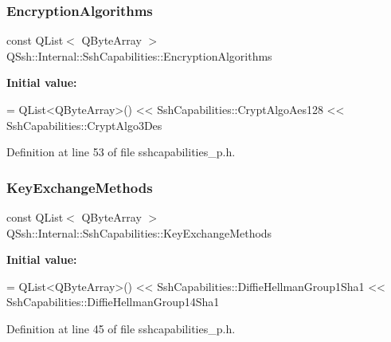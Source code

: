 \subsubsection{\texorpdfstring{Encryption\+Algorithms}{EncryptionAlgorithms}}
{\footnotesize\ttfamily const Q\+List$<$ Q\+Byte\+Array $>$ Q\+Ssh\+::\+Internal\+::\+Ssh\+Capabilities\+::\+Encryption\+Algorithms\hspace{0.3cm}{\ttfamily [static]}}

{\bfseries Initial value\+:}
\begin{DoxyCode}
= QList<QByteArray>() << SshCapabilities::CryptAlgoAes128
          << SshCapabilities::CryptAlgo3Des
\end{DoxyCode}


Definition at line 53 of file sshcapabilities\+\_\+p.\+h.

\mbox{\label{class_q_ssh_1_1_internal_1_1_ssh_capabilities_aacd11651b0231851b0370a247ca52fa6}} 
\subsubsection{\texorpdfstring{Key\+Exchange\+Methods}{KeyExchangeMethods}}
{\footnotesize\ttfamily const Q\+List$<$ Q\+Byte\+Array $>$ Q\+Ssh\+::\+Internal\+::\+Ssh\+Capabilities\+::\+Key\+Exchange\+Methods\hspace{0.3cm}{\ttfamily [static]}}

{\bfseries Initial value\+:}
\begin{DoxyCode}
= QList<QByteArray>() << SshCapabilities::DiffieHellmanGroup1Sha1
          << SshCapabilities::DiffieHellmanGroup14Sha1
\end{DoxyCode}


Definition at line 45 of file sshcapabilities\+\_\+p.\+h.

\mbox{\label{class_q_ssh_1_1_internal_1_1_ssh_capabilities_a12efb580950f4d1c3c4e2ef7b5e203c9}} 
